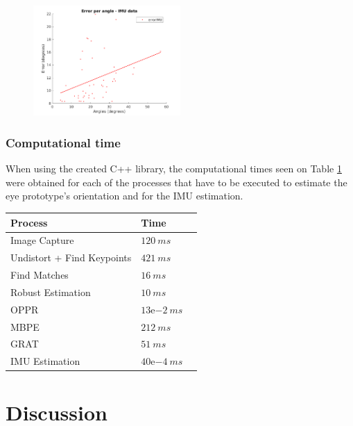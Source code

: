 \begin{figure}[ht]
	\centering
	\includegraphics[width=0.5\textwidth]{images/imuerrorissue.png}
	\label{cha5:sec1:imuerrorissue}
\end{figure}

\subsubsection{Computational time}
When using the created C++ library, the computational times seen on Table \ref{cha5:sec1:speed} were obtained for each of the processes that have to be executed to estimate the eye prototype's orientation and for the IMU estimation.

\begin{table}[ht]
	\centering
	\begin{tabular}{| l | l | l |}
		\hline
		Process & Time \\
		\hline
		Image Capture & $120 \ ms$  \\
		\hline
		Undistort + Find Keypoints &   $421 \ ms$ \\
		\hline
		Find Matches & $16 \ ms$ \\ 
		\hline
		Robust Estimation & $10 \ ms$ \\ 
		\hline
		OPPR & $13\mathrm{e}{-2} \ ms$ \\ 
		\hline
		MBPE & $212 \ ms$ \\ 
		\hline
		GRAT & $51 \ ms$ \\ 
		\hline
		IMU Estimation &  $40\mathrm{e}{-4} \ ms$ \\ 
		\hline
	\end{tabular}
	\label{cha5:sec1:speed}
\end{table}

\section{Discussion}

